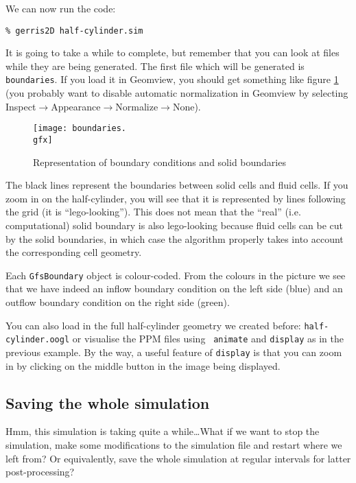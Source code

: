 \documentclass[a4paper]{article}
\begin{document}
We can now run the code:
\begin{verbatim}
% gerris2D half-cylinder.sim
\end{verbatim}
It is going to take a while to complete, but remember that you can
look at files while they are being generated. The first file which
will be generated is {\tt boundaries}. If you load it in Geomview, you
should get something like figure \ref{boundaries} (you probably want
to disable automatic normalization in Geomview by selecting
Inspect$\rightarrow$Appearance$\rightarrow$Normalize$\rightarrow$None).
\begin{figure}[htbp]
\begin{center}
\texttt{[image: boundaries.\\gfx]}
\end{center}
\caption{Representation of boundary conditions and solid boundaries}
\label{boundaries}
\end{figure}
The black lines represent the boundaries between solid cells and fluid 
cells. If you zoom in on the half-cylinder, you will see that it is
represented by lines following the grid (it is ``lego-looking''). This 
does not mean that the ``real'' (i.e. computational) solid boundary is 
also lego-looking because fluid cells can be cut by the solid
boundaries, in which case the algorithm properly takes into account
the corresponding cell geometry.

Each {\tt GfsBoundary} object is colour-coded. From the colours in the
picture we see that we have indeed an inflow boundary condition on the
left side (blue) and an outflow boundary condition on the right side
(green).

You can also load in the full half-cylinder geometry we created
before: {\tt half-cylinder.oogl} or visualise the {\sc PPM} files using {\tt 
animate} and {\tt display} as in the previous example. By the way, a
useful feature of {\tt display} is that you can zoom in by clicking on
the middle button in the image being displayed.

\subsection{Saving the whole simulation}

Hmm, this simulation is taking quite a while\dots What if we want to
stop the simulation, make some modifications to the simulation file
and restart where we left from? Or equivalently, save the whole
simulation at regular intervals for latter post-processing?
\end{document}
